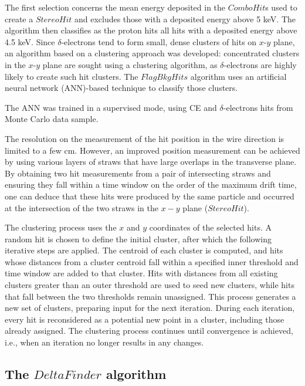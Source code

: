 The first selection concerns the 
mean energy deposited in  
the $ComboHit$s used to create a 
$StereoHit$ and excludes 
those with a deposited energy above 5 keV.
%
The algorithm then classifies as 
the proton hits all hits with a deposited 
energy above 4.5 keV.
Since $\delta$-electrons tend to form small, dense 
clusters of hits on $x$-$y$ plane, an algorithm based on a clustering 
approach was developed: concentrated clusters in the 
$x$-$y$ plane are sought using a clustering algorithm, 
as $\delta$-electrons are highly likely to create 
such hit clusters.
The $FlagBkgHits$ algorithm uses  
an artificial neural network (ANN)-based
technique to classify those clusters.

The ANN was trained in a supervised mode, 
using CE and $\delta$-electrons hits from 
Monte Carlo data sample.

The resolution on the measurement of the 
hit position in the wire direction is limited to a few cm. 
However, an improved position measurement can be 
achieved by using various layers of straws that have large overlaps in the transverse plane. 
By obtaining two hit measurements from a pair of 
intersecting straws and ensuring they fall within 
a time window on the order of the maximum drift time, 
one can deduce that these hits were produced by the 
same particle and occurred at the intersection of the 
two straws in the $x-y$ plane ($StereoHit$).

The clustering process uses the $x$ and $y$ coordinates 
of the selected hits. A random hit is chosen to define 
the initial cluster, after which the following iterative 
steps are applied. The centroid of each cluster is 
computed, and hits whose distances from a cluster 
centroid fall within a specified inner threshold 
and time window are added to that cluster. Hits 
with distances from all existing clusters greater 
than an outer threshold are used to seed new 
clusters, while hits that fall between the two 
thresholds remain unassigned. This process 
generates a new set of clusters, preparing input 
for the next iteration. During each 
iteration, every hit is reconsidered as a 
potential new point in a cluster, including 
those already assigned. The clustering process 
continues until convergence is achieved, i.e., 
when an iteration no longer results in any changes.


\subsection{The $DeltaFinder$ algorithm}\label{deltafinder}

